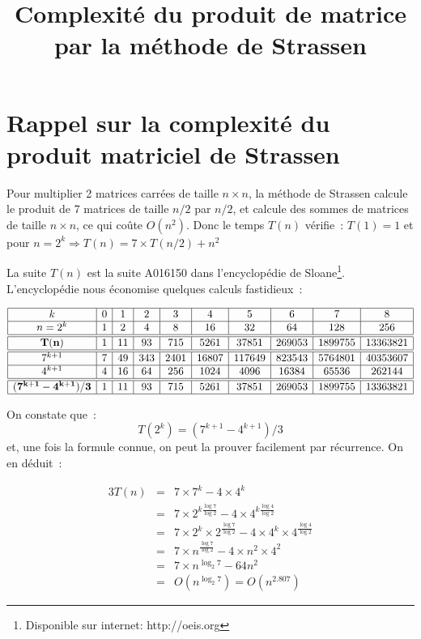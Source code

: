 \documentclass[a4paper]{article}
\begin{document}
\title{Complexité du produit de matrice par la méthode de Strassen}
\maketitle

\section{Rappel sur la complexité du produit matriciel de Strassen}
Pour multiplier 2 matrices carrées de taille $n \times n$, la méthode de Strassen
calcule le produit de 7 matrices de taille $n/2$ par $n/2$, et calcule des sommes de matrices de taille $n \times n$, ce qui coûte $O(n^2)$. Donc le temps $T(n)$
vérifie~: 
$T(1)= 1$ et pour $n=2^k \Rightarrow T(n)=7\times  T(n/2) + n^2$

La suite $T(n)$ est la suite A016150 dans l'encyclopédie de Sloane\footnote{Disponible sur internet: http://oeis.org}. L'encyclopédie nous économise quelques calculs fastidieux~:

{\footnotesize
$$\begin{array}{|c|c|c|c|c|c|c|c|c|c|}
\hline
k & 0 & 1 & 2 & 3 & 4 & 5 & 6 & 7 & 8  \\
\hline
n=2^k & 1 & 2 & 4 & 8 & 16 & 32 & 64 & 128 & 256  \\
\hline\hline
\bf{T(n)} & 1 & 11 & 93 & 715 & 5261 & 37851 & 269053 & 1899755 & 13363821 \\
\hline\hline
7^{k+1} & 7& 49& 343& 2401& 16807& 117649& 823543& 5764801& 40353607 \\
\hline
4^{k+1} & 4& 16& 64& 256& 1024& 4096& 16384& 65536& 262144 \\
\hline\hline
\bf{(7^{k+1}-4^{k+1})/3} & 1 & 11 & 93 & 715 & 5261 & 37851 & 269053 & 1899755 & 13363821 \\
\hline
\end{array}
$$
}

On constate que~:
$$T(2^k)= (7^{k+1}-4^{k+1})/3$$
et, une fois la formule connue, on peut la prouver facilement par récurrence.
On en déduit~:

\begin{eqnarray*}
3 T(n) &=&7 \times 7^k - 4 \times 4 ^ k \\
&=& 7 \times  2^{k\frac{\log 7}{\log 2}} - 4 \times 4 ^{k\frac{\log 4}{\log 2}} \\
&=& 7 \times  2^{k}\times 2^{\frac{\log 7}{\log 2}} - 4 \times 4 ^{k}\times 4^ {\frac{\log 4}{\log 2}} \\
&=& 7 \times   n ^{\frac{\log 7}{\log 2}} - 4 \times n^2 \times 4^2 \\
&=& 7 \times   n ^{\log_2 7} - 64 n^2   \\
&=&  O( n ^{\log_2 7}) = O( n ^{2.807})
\end{eqnarray*} 
\end{document}
